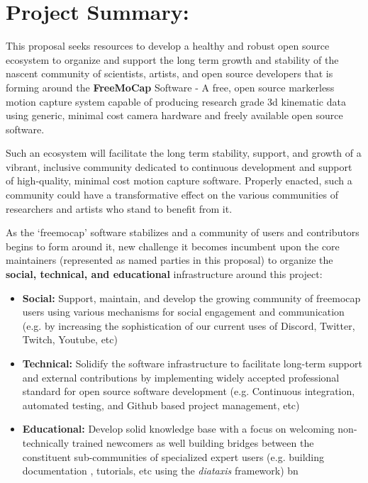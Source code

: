 \section{Project Summary:}

\noindent This proposal seeks resources to develop a healthy and robust open source ecosystem to organize and support the long term growth and stability of the nascent community of scientists, artists, and open source developers that is forming around the \textbf{FreeMoCap} Software - A free, open source markerless motion capture system capable of producing research grade 3d kinematic data using generic, minimal cost camera hardware and freely available open source software. 

 Such an ecosystem will facilitate the long term stability, support, and growth of a vibrant, inclusive community dedicated to continuous development and support of high-quality, minimal cost motion capture software. Properly enacted, such a community could have a transformative effect on the various communities of researchers and artists who stand to benefit from it.
 
As the `freemocap' software stabilizes and a community of users and contributors begins to form around it, new challenge it becomes incumbent upon the core maintainers (represented as named parties in this proposal) to organize the \textbf{social, technical, and educational} infrastructure around this project:

\begin{itemize}

    \item \textbf{Social:} Support, maintain, and develop the growing community of freemocap users using various mechanisms for social engagement and communication (e.g. by increasing the sophistication of our current uses of Discord, Twitter, Twitch, Youtube, etc)
    
    \item \textbf{Technical:} Solidify the software infrastructure to facilitate long-term support and external contributions by implementing widely accepted professional standard for open source software development (e.g. Continuous integration, automated testing, and Github based project management, etc)
    
    \item \textbf{Educational:} Develop solid knowledge base with a focus on welcoming non-technically trained newcomers as well building bridges between the constituent sub-communities of specialized expert users (e.g. building documentation , tutorials, etc using the \textit{diataxis} framework) bn  

\end{itemize}

